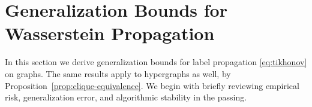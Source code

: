 \documentclass[letterpaper]{article} %
\begin{document}
\section{Generalization Bounds for Wasserstein Propagation}
In this section we derive generalization bounds for label propagation \eqref{eq:tikhonov} on graphs. The same results apply to hypergraphs as well, by Proposition~\ref{prop:clique-equivalence}. We begin with briefly reviewing empirical risk, generalization error, and algorithmic stability in the passing.

\end{document}
